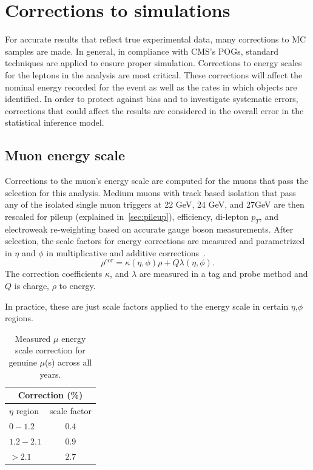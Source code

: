 \section{Corrections to simulations}
\label{sec:corrections}

For accurate results that reflect true experimental data, many corrections to MC samples are made. In general, in compliance with CMS's POGs, standard techniques are applied to ensure proper simulation. Corrections to energy scales for the leptons in the analysis are most critical. These corrections will affect the nominal energy recorded for the event as well as the rates in which objects are identified.  In order to protect against bias and to investigate systematic errors, corrections that could affect the results are considered in the overall error in the statistical inference model.

\subsection{Muon energy scale}
Corrections to the muon's energy scale are computed for the muons that pass the selection for this analysis. Medium muons with track based isolation that pass any of the isolated single muon triggers at 22 GeV, 24 GeV, and 27GeV are then rescaled for pileup (explained in~\ref{sec:pileup}), efficiency, di-lepton $p_T$, and electroweak re-weighting based on accurate gauge boson measurements. After selection, the scale factors for energy corrections are measured and parametrized in $\eta$ and $\phi$ in multiplicative and additive corrections~\cite{Bodek_2012}. 
\begin{equation}\rho^{\text{cor}}=\kappa(\eta,\phi)\rho+Q \lambda(\eta,\phi)\text{.}\end{equation} 
The correction coefficients $\kappa$, and $\lambda$ are measured in a tag and probe method and $Q$ is charge, $\rho$ to energy.

In practice, these are just scale factors applied to the energy scale in certain $\eta$,$\phi$ regions. \\
\begin{table}[h]
  \begin{center}
    \label{tab:MES}
    \begin{tabular} { l | c }
      \hline \multicolumn{2}{c}{Correction (\%)} \\
      \hline $\eta$ region & scale factor  \\ \hline
      $0 - 1.2$ & $0.4$ \\ 
      $1.2 - 2.1 $& $0.9 $\\ 
      $> 2.1$ & $2.7$ \\ 
    \end{tabular}
    \caption{Measured $\mu$ energy scale correction for genuine $\mu$(s) across all years.}
  \end{center}
\end{table}\\

